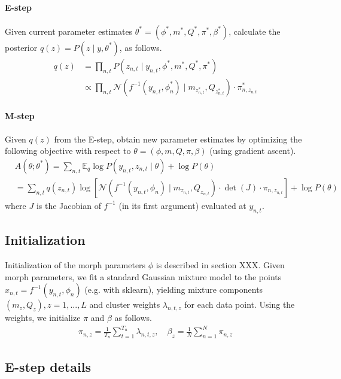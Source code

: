 \documentclass{article}         %
\newcommand{\EE}{\mathbb{E}}
\newcommand{\NN}{\mathcal{N}}
\begin{document}
\paragraph{E-step} Given current parameter estimates $\theta^* = (\phi^*, m^*, Q^*, \pi^*, \beta^*)$, calculate the posterior $q(z) = P(z \mid y, \theta^*)$, as follows.
%
\begin{align}
    q(z) & = \prod_{n,t} P(z_{n,t} \mid y_{n,t}, \phi^*, m^*, Q^*, \pi^*) \\
    & \propto  \prod_{n,t}  \NN(f^{-1}(y_{n,t}, \phi^*_n) \mid m_{z_{n,t}^*}, Q_{z_{n,t}^*}) \cdot \pi_{n,z_{n,t}}^* \label{eq:q-propto-statement}
\end{align}

\paragraph{M-step} Given $q(z)$ from the E-step, obtain new parameter estimates by optimizing the following objective with respect to $\theta = (\phi, m, Q, \pi, \beta)$ (using gradient ascent).
\begin{align}
    & A(\theta; \theta^*)  = \sum_{n,t} \EE_q \log P(y_{n,t}, z_{n,t} \mid \theta) + \log P(\theta) \\
    & =  \sum_{n,t} q(z_{n,t}) \log \left[ \NN(f^{-1}(y_{n,t}, \phi_n) \mid m_{z_{n,t}}, Q_{z_{n,t}}) \cdot \det(J)  \cdot \pi_{n, z_{n, t}} \right] + \log P(\theta) \label{eq:A-modeled}
\end{align}
where $J$ is the Jacobian of $f^{-1}$ (in its first argument) evaluated at $y_{n,t}$.

\subsection{Initialization}
Initialization of the morph parameters $\phi$ is described in section XXX. Given morph parameters, we fit a standard Gaussian mixture model to the points $x_{n,t} = f^{-1}(y_{n,t}, \phi_n)$ (e.g. with sklearn), yielding mixture components $(m_z, Q_z), z=1,...,L$ and cluster weights $\lambda_{n,t,z}$ for each data point. Using the weights, we initialize $\pi$ and $\beta$ as follows.
\begin{align}
    \pi_{n,z} = \frac{1}{T_n} \sum_{t=1}^{T_n} \lambda_{n,t,z}, \quad \beta_z = \frac{1}{N} \sum_{n=1}^N \pi_{n,z}
\end{align}



\subsection{E-step details}
\end{document}
